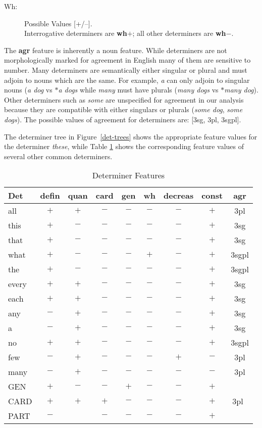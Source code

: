 \begin{description}

\item[Wh:]  Possible Values [+/--]. \\
Interrogative determiners are {\bf wh$+$}; all other determiners are
{\bf wh$-$}. 
\end{description}

The {\bf agr} feature is inherently a noun feature.  While determiners
are not morphologically marked for agreement in English many of them
are sensitive to number.  Many determiners are semantically either
singular or plural and must adjoin to nouns which are the same. For
example, {\it a\/} can only adjoin to singular nouns ({\it a dog\/} vs
{\it $\ast$a dogs\/} while {\it many\/} must have plurals ({\it many
dogs\/} vs {\it $\ast$many dog\/}). Other determiners such as {\it some} are
unspecified for agreement in our analysis because they are compatible
with either singulars or plurals ({\it some dog}, {\it some
dogs}). The possible values of agreement for determiners are: [3sg, 3pl, 3sgpl].




The determiner tree in Figure~\ref{det-trees} shows the appropriate
feature values for the determiner {\it these}, while Table \ref{det-values}
shows the corresponding feature values of several other common determiners.

\tiny
\begin{table}
\centering
\begin{tabular}{|l||c|c|c|c|c|c|c|c|}
\hline
Det&defin&quan&card&gen&wh&decreas&const&agr\\
\hline
\hline
all&$+$&$+$&$-$&$-$&$-$&$-$&$+$&3pl\\
this&$+$&$-$&$-$&$-$&$-$&$-$&$+$&3sg\\
that&$+$&$-$&$-$&$-$&$-$&$-$&$+$&3sg\\
what&$+$&$-$&$-$&$-$&$+$&$-$&$+$&3sgpl\\
the&$+$&$-$&$-$&$-$&$-$&$-$&$+$&3sgpl\\
every&$+$&$+$&$-$&$-$&$-$&$-$&$+$&3sg\\
each&$+$&$+$&$-$&$-$&$-$&$-$&$+$&3sg\\
any&$-$&$+$&$-$&$-$&$-$&$-$&$+$&3sg\\
a&$-$&$+$&$-$&$-$&$-$&$-$&$+$&3sg\\
no&$+$&$+$&$-$&$-$&$-$&$-$&$+$&3sgpl\\
few&$-$&$+$&$-$&$-$&$-$&$+$&$-$&3pl\\
many&$-$&$+$&$-$&$-$&$-$&$-$&$-$&3pl\\
GEN&$+$&$-$&$-$&$+$&$-$&$-$&$+$&\\
CARD&$+$&$+$&$+$&$-$&$-$&$-$&$+$&3pl\footnotemark\ \\
PART&$-$&&$-$&$-$&$-$&$-$&$+$&\\
\hline
\end{tabular}
 \caption{Determiner Features}
\label{det-values}
\end{table}\addtocounter{footnote}{0} 

